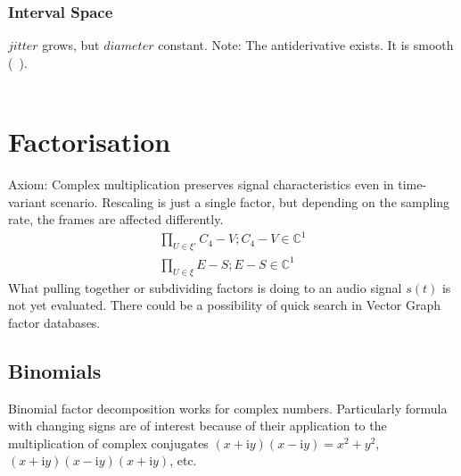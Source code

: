 \documentclass{report}
\begin{document}
\subsection*{Interval Space}
$jitter$ grows, but $diameter$ constant.
Note: The antiderivative exists. It is smooth (~\cite[Riemann Integrable]{Widon}).\\\\

\chapter{Factorisation}
Axiom: Complex multiplication preserves signal characteristics even in time-variant scenario. Rescaling is just a single factor, but depending on the sampling rate, the frames are affected differently.
\begin{align}
\prod \limits _{U \in \xi'} C_{4}-V;C_{4}-V \in \mathbb{C}^1\\
\prod \limits _{U \in \xi} E-S;E-S \in \mathbb{C}^1
\end{align}
What pulling together or subdividing factors is doing to an audio signal $s(t)$ is not yet evaluated. There could be a possibility of quick search in Vector Graph factor databases.
\section{Binomials}
Binomial factor decomposition works for complex numbers. Particularly formula with changing signs are of interest because of their application to the multiplication of complex conjugates $(x+\mathrm{i}y)(x-\mathrm{i}y)=x^2+y^2$, $(x+\mathrm{i}y)(x-\mathrm{i}y)(x+\mathrm{i}y)$, etc.
\end{document}
